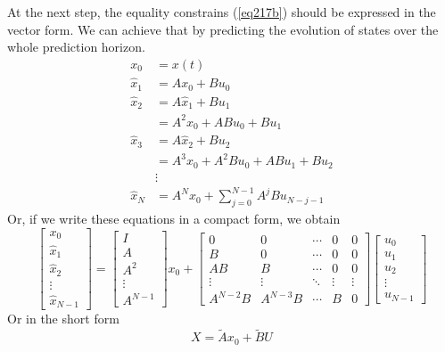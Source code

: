 At the next step, the equality constrains (\ref{eq217b}) should be expressed in the vector form. We can achieve that by predicting the evolution of states over the whole prediction horizon.
\begin{equation}
\begin{split}
x_0 &= x(t)\\
\hat{x}_{1} &= Ax_0 + Bu_0\\
\hat{x}_{2} &= A\hat{x}_{1} + Bu_{1}\\
&= A^2x_0 + ABu_0 + Bu_{1}\\
\hat{x}_{3} &= A\hat{x}_{2} + Bu_{2}\\
&= A^3x_0 + A^2Bu_0 + ABu_{1} + Bu_{2}\\
&\vdots\\
\hat{x}_{N} &= A^Nx_0+\sum_{j=0}^{N-1}A^jBu_{N-j-1}
\end{split}
\end{equation}
Or, if we write these equations in a compact form, we obtain
\begin{equation}
	\begin{bmatrix}
	x_0\\\hat{x}_{1}\\ \hat{x}_{2}\\\vdots\\ \hat{x}_{N-1}
	\end{bmatrix} = 
	\begin{bmatrix}I\\A\\A^2\\ \vdots \\ A^{N-1}\end{bmatrix}x_0 + 
	\begin{bmatrix}
	0& 0&\cdots&0&0\\
	B&0&\cdots&0&0\\
	AB&B&\cdots&0&0\\
	\vdots&\vdots&\ddots&\vdots&\vdots\\
	A^{N-2}B&A^{N-3}B&\cdots&B&0\end{bmatrix}
	\begin{bmatrix}u_0\\u_{1}\\u_{2}\\\vdots\\u_{N-1}\end{bmatrix}
\end{equation}
Or in the short form
\begin{equation}\label{eq227}
	X = \tilde{A}x_0 + \tilde{B}U
\end{equation}
